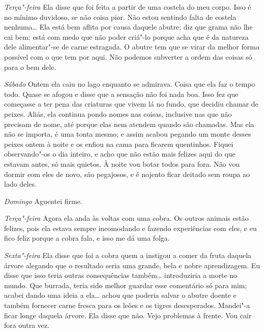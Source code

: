 \textit{Terça"-feira}   Ela disse que foi feita a partir de uma costela do meu corpo. Isso
é no mínimo duvidoso, se não coisa pior. Não estou sentindo falta de costela
nenhuma\ldots{} Ela está bem aflita por causa daquele abutre; diz que grama não lhe
cai bem; está com medo que não poder criá"-lo porque acha que é da
natureza dele alimentar"-se de carne estragada. O abutre tem que se virar da
melhor forma possível com o que tem por aqui. Não podemos subverter a ordem
das coisas só para o bem dele.

\textit{Sábado}  Ontem ela caiu no lago enquanto se admirava. Coisa que ela faz o
tempo todo. Quase se afogou e disse que a sensação não foi nada boa. Isso
fez que começasse a ter pena das criaturas que vivem lá no fundo, que 
decidiu chamar de peixes. Aliás, ela continua pondo nomes nas coisas, inclusive
nas que não precisam de nome, até porque elas nem atendem quando são chamadas.
Mas ela não se importa, é uma tonta mesmo; e assim acabou pegando um monte
desses peixes ontem à noite e os enfiou na cama para ficarem quentinhos. Fiquei
observando"-os o dia inteiro, e acho que não estão mais felizes aqui do que
estavam antes, só mais quietos. À noite vou botar todos para fora. Não vou
dormir com eles de novo, são pegajosos, e é nojento ficar
deitado sem roupa ao lado deles.

\textit{Domingo}  Aguentei firme.

\textit{Terça"-feira}   Agora ela anda às voltas com uma cobra. Os outros animais estão
felizes, pois ela estava sempre incomodando e fazendo experiências com eles, e
eu fico feliz porque a cobra fala, e isso me dá uma folga.

\textit{Sexta"-feira}  Ela disse que foi a cobra quem a instigou a comer da fruta daquela
árvore alegando que o resultado seria uma grande, bela e nobre
aprendizagem. Eu disse que isso teria outras consequências também\ldots{} introduziria
a morte no mundo. Que burrada, teria sido melhor guardar esse comentário só
para mim; acabei dando uma ideia a ela\ldots{} achou que poderia salvar o abutre doente
e também fornecer carne fresca para os leões e os tigres desesperados. Mandei"-a
ficar longe daquela árvore. Ela disse que não. Vejo problemas à frente. Vou cair fora outra vez.

